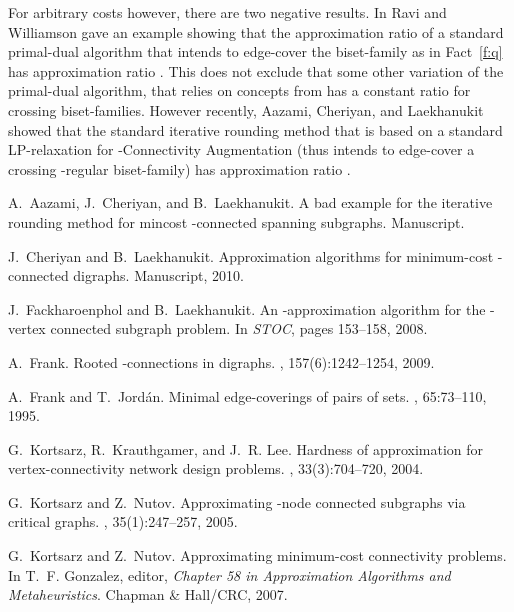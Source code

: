 For arbitrary costs however, there are two negative results.
In \cite{RWe} Ravi and Williamson gave an example showing that the approximation
ratio of a standard primal-dual algorithm that intends to edge-cover 
the biset-family  as in Fact~\ref{f:q} has approximation ratio .
This does not exclude that some other variation of the primal-dual algorithm, that relies on concepts from \cite{FJ}
has a constant ratio for crossing biset-families.
However recently, Aazami, Cheriyan, and Laekhanukit \cite{ACL} showed that the standard iterative 
rounding method that is based on a standard LP-relaxation for {\sf -Connectivity Augmentation}
(thus intends to edge-cover a crossing -regular biset-family) has approximation ratio . 



\begin{thebibliography}{10}

A.~Aazami, J.~Cheriyan, and B.~Laekhanukit.
\newblock A bad example for the iterative rounding method for mincost
  -connected spanning subgraphs.
\newblock Manuscript.

J.~Cheriyan and B.~Laekhanukit.
\newblock Approximation algorithms for minimum-cost -{} connected
  digraphs.
\newblock Manuscript, 2010.

J.~Fackharoenphol and B.~Laekhanukit.
\newblock An -approximation algorithm for the -vertex
  connected subgraph problem.
\newblock In {\em STOC}, pages 153--158, 2008.

A.~Frank.
\newblock Rooted -connections in digraphs.
, 157(6):1242--1254, 2009.

A.~Frank and T.~Jord\'{a}n.
\newblock Minimal edge-coverings of pairs of sets.
, 65:73--110, 1995.

G.~Kortsarz, R.~Krauthgamer, and J.~R. Lee.
\newblock Hard\-ness of approximation for vertex-connectivity net\-work design
  problems.
, 33(3):704--720, 2004.

G.~Kortsarz and Z.~Nutov.
\newblock Approximating -node connected subgraphs via critical graphs.
, 35(1):247--257, 2005.

G.~Kortsarz and Z.~Nutov.
\newblock Approximating minimum-cost connectivity problems.
\newblock In T.~F. Gonzalez, editor, {\em {\em Chapter 58 in} Approximation
  Algorithms and Metaheuristics}. Chapman \& Hall/CRC, 2007.


\end{thebibliography}
